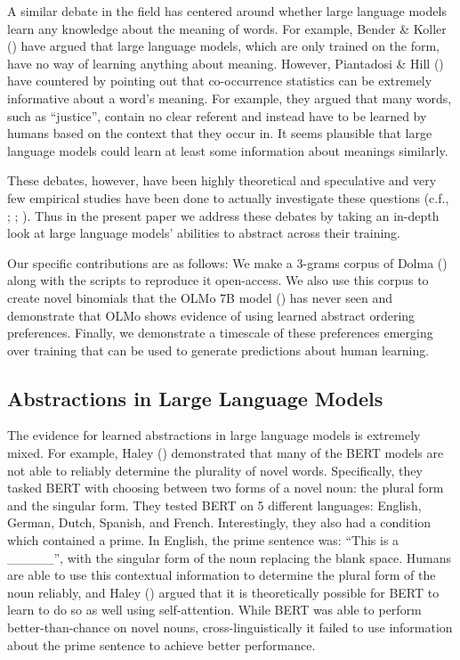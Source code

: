 \documentclass[
  nottoc]{article}
\begin{document}
A similar debate in the field has centered around whether large language
models learn any knowledge about the meaning of words. For example,
Bender \& Koller () have argued
that large language models, which are only trained on the form, have no
way of learning anything about meaning. However, Piantadosi \& Hill
() have
countered by pointing out that co-occurrence statistics can be extremely
informative about a word's meaning. For example, they argued that many
words, such as ``justice'', contain no clear referent and instead have
to be learned by humans based on the context that they occur in. It
seems plausible that large language models could learn at least some
information about meanings similarly.

These debates, however, have been highly theoretical and speculative and
very few empirical studies have been done to actually investigate these
questions (c.f., ; ;
). Thus in the present
paper we address these debates by taking an in-depth look at large
language models' abilities to abstract across their training.

Our specific contributions are as follows: We make a 3-grams corpus of
Dolma () along with the scripts to reproduce it open-access. We also use
this corpus to create novel binomials that the OLMo 7B model
() has never seen and demonstrate that OLMo shows evidence of using
learned abstract ordering preferences. Finally, we demonstrate a
timescale of these preferences emerging over training that can be used
to generate predictions about human learning.

\subsection{Abstractions in Large Language
Models}\label{abstractions-in-large-language-models}

The evidence for learned abstractions in large language models is
extremely mixed. For example, Haley ()
demonstrated that many of the BERT models are not able to reliably
determine the plurality of novel words. Specifically, they tasked BERT
with choosing between two forms of a novel noun: the plural form and the
singular form. They tested BERT on 5 different languages: English,
German, Dutch, Spanish, and French. Interestingly, they also had a
condition which contained a prime. In English, the prime sentence was:
``This is a \_\_\_\_\_'', with the singular form of the noun replacing
the blank space. Humans are able to use this contextual information to
determine the plural form of the noun reliably, and Haley
() argued that it is theoretically
possible for BERT to learn to do so as well using self-attention. While
BERT was able to perform better-than-chance on novel nouns,
cross-linguistically it failed to use information about the prime
sentence to achieve better performance.
\end{document}
